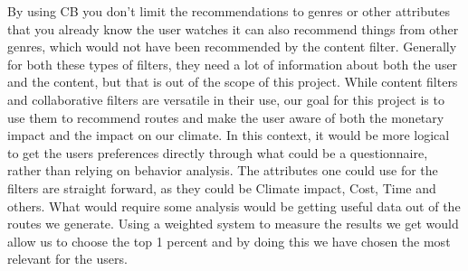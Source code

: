 By using CB you don't limit the recommendations to genres or other attributes that you already know the user watches it
can also recommend things from other genres, which would not have been recommended by the content filter.\newline
Generally for both these types of filters, they need a lot of information about both the user and the content, but that
is out of the scope of this project.
While content filters and collaborative filters are versatile in their use, our goal for this project is to use them to
recommend routes and make the user aware of both the monetary impact and the impact on our climate.
In this context, it would be more logical to get the users preferences directly through what could be a questionnaire,
rather than relying on behavior analysis.
The attributes one could use for the filters are straight forward, as they could be Climate impact, Cost, Time and
others.
What would require some analysis would be getting useful data out of the routes we generate.
Using a weighted system to measure the results we get would allow us to choose the top 1 percent and by doing this we
have chosen the most relevant for the users.
